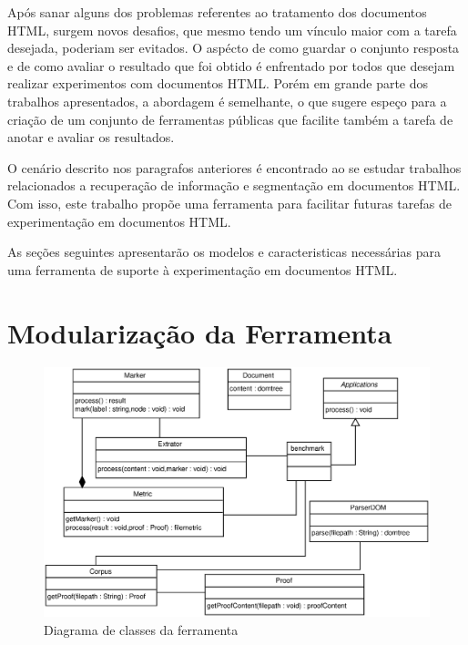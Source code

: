 \documentclass[12pt, a4paper]{article}
\begin{document}

Após sanar alguns dos problemas referentes ao tratamento dos documentos
HTML, surgem novos desafios, que mesmo tendo um vínculo maior com a tarefa
desejada, poderiam ser evitados. O aspécto de como guardar o conjunto
resposta e de como avaliar o resultado que foi obtido é enfrentado por
todos que desejam realizar experimentos com documentos HTML. Porém em
grande parte dos trabalhos apresentados, a abordagem é semelhante, o que
sugere espeço para a criação de um conjunto de ferramentas públicas que
facilite também a tarefa de anotar e avaliar os resultados.

O cenário descrito nos paragrafos anteriores é encontrado ao se estudar 
trabalhos relacionados a recuperação de informação e segmentação em documentos
HTML. Com isso, este trabalho propõe uma ferramenta para
facilitar futuras tarefas de experimentação em documentos HTML.

As seções seguintes apresentarão os modelos e caracteristicas
necessárias para uma ferramenta de suporte à experimentação em
documentos HTML.

\section{Modularização da Ferramenta}

\begin{figure}[htb]
  \begin{center}
  \includegraphics[width=13cm]{img/classes.eps}
  \caption{Diagrama de classes da ferramenta}
  \label{classes}
  \end{center}
\end{figure}
\end{document}
